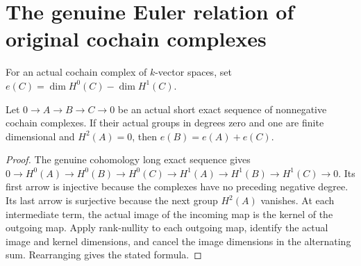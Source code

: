 \section{The genuine Euler relation of original cochain complexes}

\begin{definition}
\label{def:fc-cohomology-euler-additivity}
\leanok
{}
For an actual cochain complex of $k$-vector spaces, set
$e(C)=\dim H^0(C)-\dim H^1(C)$.
\end{definition}

\begin{theorem}
\label{thm:fc-cohomology-euler-additivity}
\leanok
{}
Let $0\to A\to B\to C\to0$ be an actual short exact sequence of
nonnegative cochain complexes. If their actual groups in degrees zero
and one are finite dimensional and $H^2(A)=0$, then
$e(B)=e(A)+e(C)$.
\end{theorem}
\begin{proof}
The genuine cohomology long exact sequence gives
$0\to H^0(A)\to H^0(B)\to H^0(C)\to H^1(A)\to H^1(B)\to H^1(C)\to0$.
Its first arrow is injective because the complexes have no preceding
negative degree. Its last arrow is surjective because the next group
$H^2(A)$ vanishes. At each intermediate term, the actual image of the
incoming map is the kernel of the outgoing map. Apply rank-nullity
to each outgoing map, identify the actual image and kernel dimensions,
and cancel the image dimensions in the alternating sum. Rearranging
gives the stated formula.
\end{proof}
